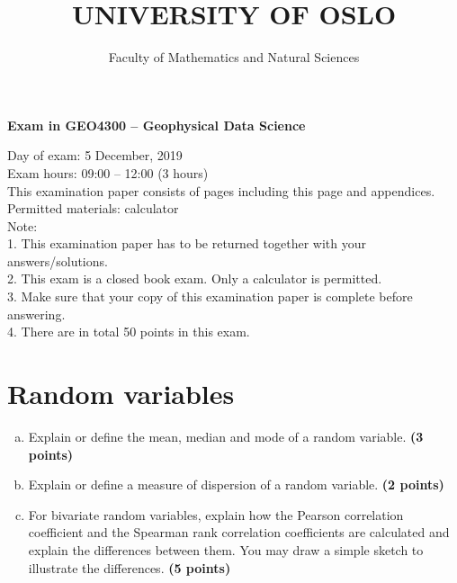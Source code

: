 \documentclass[12pt]{article}
\date{}
\begin{document}
\author{Faculty of Mathematics and Natural Sciences}

\title{UNIVERSITY OF OSLO}

\maketitle 
\begin{center}
\textbf{Exam in GEO4300 -- Geophysical Data Science}
\end{center}


Day of exam: 5 December, 2019 \\
Exam hours: 09:00 -- 12:00 (3 hours) \\ 

This examination paper consists of \pageref{LastPage} pages including this page and appendices. \\

Permitted materials: calculator\\ 

Note: \\
1. This examination paper has to be returned together with your answers/solutions.\\
2. This exam is a closed book exam. Only a calculator is permitted.\\ 
3. Make sure that your copy of this examination paper is complete before answering.\\ 
4. There are in total 50 points in this exam.\\


\pagebreak


\section{Random variables}

\begin{enumerate}[(a)] 
\item Explain or define the mean, median and mode of a random variable. \textbf{\hfill (3 points)}
\item Explain or define a measure of dispersion of a random variable. \textbf{\hfill (2 points)}
\item For bivariate random variables, explain how the Pearson correlation coefficient and the Spearman rank correlation coefficients are calculated and explain the differences between them. You may draw a simple sketch to illustrate the differences. \textbf{\hfill (5 points)}
\end{enumerate}
\end{document}
